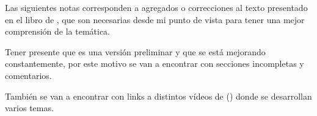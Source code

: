 \begin{titlepage}
\centering
  \vspace*{.01\textheight}
  \begin{tcolorbox}[colback=black!5!white,colframe=green!35!black]
    \centering
    {\bf\scshape\Huge  \titulo \par}
    \vspace{1cm}
    {\scshape \large \subtitulo \par}
  \end{tcolorbox}
  \vspace{3cm}
  {\itshape\Large \autor \par}
  \vspace{5cm}
  {\large \number\year \par}
  \vfill
  {\small \version \par}

\end{titlepage}

\vspace*{1cm}
Las siguientes notas corresponden a agregados o correcciones al texto presentado
en el libro de \citeauthor{alvarenga}, que son necesarias desde mi punto de
vista para tener una mejor comprensión de la temática.

Tener presente que es una versión preliminar y que se está mejorando
constantemente, por este motivo se van a encontrar con secciones incompletas y
comentarios. %

También se van a encontrar con links a distintos vídeos de \citeauthor{coca:ytb}
(\citeyear{coca:ytb}) donde se desarrollan varios temas.



